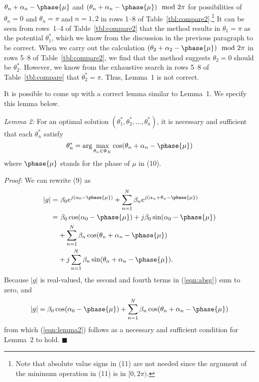  $\theta_n + \alpha_n -\phase{\mu}$ and
$(\theta_n + \alpha_n - \phase{\mu}) \mod 2\pi$ for possibilities of $\theta_n = 0$ and
$\theta_n=\pi$ and
$n=1,2$ in rows 1--8 of Table~\ref{tbl:compare2}.\footnote{Note that absolute value
signs in (11) are not needed since the argument of the minimum operation
in (11) is in $[0, 2\pi)$.} It can be seen from rows~1--4 of Table~\ref{tbl:compare2}
that the method results in $\theta_1 = \pi$ as the potential $\theta_1^*$, which we
know from the discussion in the previous paragraph to be correct. When we carry out
the calculation $(\theta_2 + \alpha_2 - \phase{\mu}) \mod 2\pi$ in rows 5--8 of
Table~\ref{tbl:compare2}, we find that the method suggests $\theta_2=0$ should be
$\theta_2^*$. However, we know from the exhaustive search in rows 5--8 of
Table~\ref{tbl:compare} that $\theta_2^*=\pi$. Thus, Lemma~1 is not correct.

It is possible to come up with a correct lemma similar to Lemma~1. We
specify this lemma below.

{\em Lemma 2:\/} For an optimal solution $(\theta_1^*, \theta_2^*, \ldots,
\theta_n^*)$, it is necessary and sufficient that each $\theta_n^*$ satisfy
\begin{equation}
\theta_n^* = \arg \max_{\theta_n\in \Phi_K} \cos(\theta_n + \alpha_n -\phase{\mu})
\label{eqn:lemma2}
\end{equation}
where $\phase{\mu}$ stands for the phase of $\mu$ in (10).

{\em Proof:\/} We can rewrite (9) as
\begin{align}
|g| =& \ \beta_0 e^{j(\alpha_0-\phase{\mu})} + \sum_{n=1}^N \beta_n e^{j(\alpha_n+\theta_n-\phase{\mu})} \\
 = & \ \beta_0 \cos(\alpha_0 - \phase{\mu}) + j \beta_0 \sin (\alpha_0-\phase{\mu}) \nonumber\\
 & + \sum_{n=1}^N \beta_n \cos(\theta_n + \alpha_n - \phase{\mu}) \nonumber\\
 & + j \sum_{n=1}^N \beta_n \sin(\theta_n + \alpha_n - \phase{\mu}).
 \label{eqn:absg}
\end{align}
Because $|g|$ is real-valued, the second and fourth terms in (\ref{eqn:absg}) sum to zero, and
\begin{equation}
|g| = \beta_0 \cos(\alpha_0 - \phase{\mu}) + \sum_{n=1}^N \beta_n \cos(\theta_n + \alpha_n - \phase{\mu})
\end{equation}
from which (\ref{eqn:lemma2}) follows as a necessary and sufficient condition for Lemma~2 to hold.
\hfill$\blacksquare$

